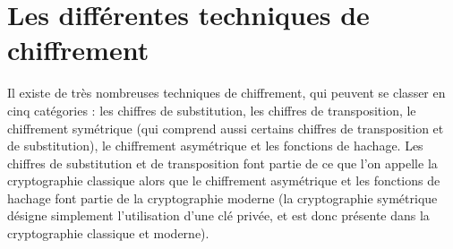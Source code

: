 \chapter{Les différentes techniques de
chiffrement\label{chap:Techniques}}
\thispagestyle{empty}
Il existe de très nombreuses techniques de chiffrement, qui
peuvent se classer en cinq catégories : les chiffres de
substitution, les chiffres de transposition, le chiffrement
symétrique (qui comprend aussi certains chiffres de transposition
et de substitution), le chiffrement asymétrique et les fonctions de
hachage.
Les chiffres de substitution et de transposition font partie de ce
que l'on appelle la cryptographie classique alors que le
chiffrement asymétrique et les fonctions de hachage
font partie de la cryptographie moderne (la cryptographie
symétrique désigne simplement l'utilisation d'une clé privée, et
est donc présente dans la cryptographie classique et moderne).










